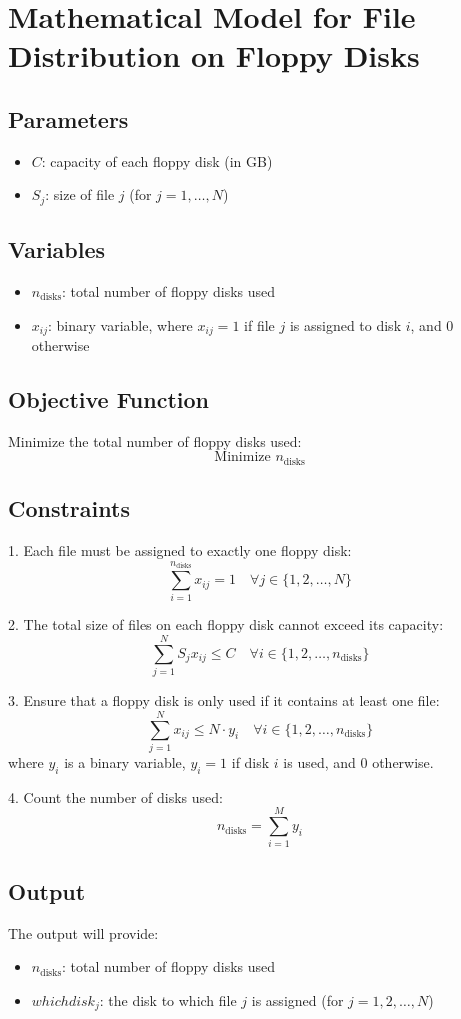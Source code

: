 \documentclass{article}
\begin{document}
\section*{Mathematical Model for File Distribution on Floppy Disks}

\subsection*{Parameters}
\begin{itemize}
    \item $C$: capacity of each floppy disk (in GB)
    \item $S_j$: size of file $j$ (for $j = 1, \ldots, N$)
\end{itemize}

\subsection*{Variables}
\begin{itemize}
    \item $n_{\text{disks}}$: total number of floppy disks used
    \item $x_{ij}$: binary variable, where $x_{ij} = 1$ if file $j$ is assigned to disk $i$, and $0$ otherwise
\end{itemize}

\subsection*{Objective Function}
Minimize the total number of floppy disks used:
\[
\text{Minimize } n_{\text{disks}}
\]

\subsection*{Constraints}
1. Each file must be assigned to exactly one floppy disk:
\[
\sum_{i=1}^{n_{\text{disks}}} x_{ij} = 1 \quad \forall j \in \{1, 2, \ldots, N\}
\]

2. The total size of files on each floppy disk cannot exceed its capacity:
\[
\sum_{j=1}^{N} S_j x_{ij} \leq C \quad \forall i \in \{1, 2, \ldots, n_{\text{disks}}\}
\]

3. Ensure that a floppy disk is only used if it contains at least one file:
\[
\sum_{j=1}^{N} x_{ij} \leq N \cdot y_i \quad \forall i \in \{1, 2, \ldots, n_{\text{disks}}\}
\]
where \( y_i \) is a binary variable, \( y_i = 1 \) if disk \( i \) is used, and \( 0 \) otherwise.

4. Count the number of disks used:
\[
n_{\text{disks}} = \sum_{i=1}^{M} y_i
\]

\subsection*{Output}
The output will provide:
\begin{itemize}
    \item $n_{\text{disks}}$: total number of floppy disks used
    \item $whichdisk_j$: the disk to which file $j$ is assigned (for $j = 1, 2, \ldots, N$)
\end{itemize}
\end{document}
